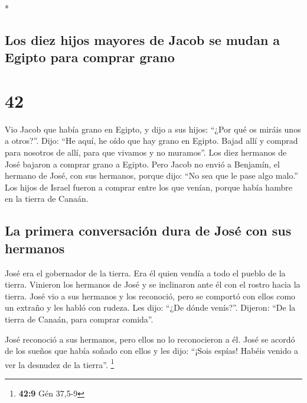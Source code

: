 \begin{paracol}{2}
\begin{otherlanguage}{english}
\end{otherlanguage}

\switchcolumn[0]*

\hypertarget{los-diez-hijos-mayores-de-jacob-se-mudan-a-egipto-para-comprar-grano}{%
\subsection{Los diez hijos mayores de Jacob se mudan a Egipto para
comprar
grano}\label{los-diez-hijos-mayores-de-jacob-se-mudan-a-egipto-para-comprar-grano}}

\hypertarget{section-82}{%
\section{42}\label{section-82}}

 Vio Jacob que había grano en Egipto, y dijo a sus hijos:
``¿Por qué os miráis unos a otros?''.  Dijo: ``He aquí, he
oído que hay grano en Egipto. Bajad allí y comprad para nosotros de
allí, para que vivamos y no muramos''.  Los diez hermanos
de José bajaron a comprar grano a Egipto.  Pero Jacob no
envió a Benjamín, el hermano de José, con sus hermanos, porque dijo:
``No sea que le pase algo malo.''  Los hijos de Israel
fueron a comprar entre los que venían, porque había hambre en la tierra
de Canaán.

\hypertarget{la-primera-conversaciuxf3n-dura-de-josuxe9-con-sus-hermanos}{%
\subsection{La primera conversación dura de José con sus
hermanos}\label{la-primera-conversaciuxf3n-dura-de-josuxe9-con-sus-hermanos}}

 José era el gobernador de la tierra. Era él quien vendía
a todo el pueblo de la tierra. Vinieron los hermanos de José y se
inclinaron ante él con el rostro hacia la tierra.  José
vio a sus hermanos y los reconoció, pero se comportó con ellos como un
extraño y les habló con rudeza. Les dijo: ``¿De dónde venís?''. Dijeron:
``De la tierra de Canaán, para comprar comida''.

 José reconoció a sus hermanos, pero ellos no lo
reconocieron a él.  José se acordó de los sueños que había
soñado con ellos y les dijo: ``¡Sois espías! Habéis venido a ver la
desnudez de la tierra''. \footnote{\textbf{42:9} Gén 37,5-9}


\end{paracol}
